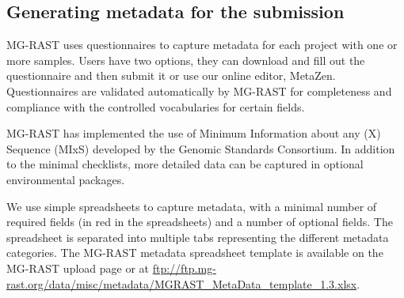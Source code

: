 \documentclass[12pt,fullpage]{report}
\begin{document}


\subsection*{Generating metadata for the submission}
\label{section:generating_metadata}

MG-RAST uses questionnaires to capture metadata for each project with one or more samples. Users have two options, they can download and fill out the questionnaire and then submit it or use our online editor, MetaZen.
Questionnaires are validated automatically by MG-RAST for completeness and compliance with the controlled vocabularies for certain fields.


MG-RAST has implemented the use of Minimum Information about any (X) Sequence (MIxS)\cite{MIENS} developed by the Genomic Standards Consortium. In addition to the minimal checklists, more detailed data can be captured in optional environmental packages.

We use simple spreadsheets to capture metadata, with a minimal number of required fields (in red in the spreadsheets) and a number of optional fields. The spreadsheet is separated into multiple tabs representing the different metadata categories. The MG-RAST metadata spreadsheet template is available on the MG-RAST upload page or at \url{ftp://ftp.mg-rast.org/data/misc/metadata/MGRAST_MetaData_template_1.3.xlsx}.
\end{document}
